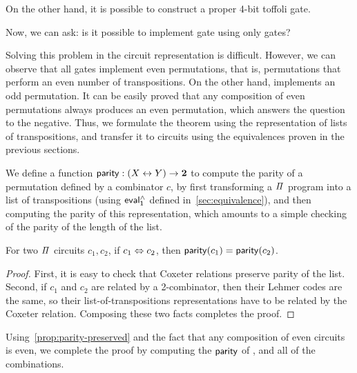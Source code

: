 \noindent
On the other hand, it is possible to construct a proper 4-bit toffoli gate.
\medskip
\toffoli{}

\noindent
Now, we can ask: is it possible to implement  gate using only  gates?
\medskip

Solving this problem in the circuit representation is difficult. However, we can observe that all  gates
implement even permutations, that is, permutations that perform an even number of transpositions. On the other hand,
 implements an odd permutation. It can be easily proved that any composition of even permutations always
produces an even permutation, which answers the question to the negative. Thus, we formulate the theorem using the
representation of lists of transpositions, and transfer it to circuits using the equivalences proven in the previous
sections.

We define a function $\operatorname{\mathsf{parity}} : (X \mathrel{\leftrightarrow} Y) \to {\mathbf{2}}$ to compute the parity of a permutation defined by a combinator
$c$, by first transforming a $\mathit{\Pi}$ program into a list of transpositions (using $\evalh_{1}$ defined
in~\cref{sec:equivalence}), and then computing the parity of this representation, which amounts to a simple checking of
the parity of the length of the list.

\begin{propositionrep}
  \label{prop:parity-preserved}
  For two $\mathit{\Pi}$ circuits $c_1, c_2$, if $c_1 \mathrel{\Leftrightarrow} c_2$, then $\operatorname{\mathsf{parity}}(c_1) = \operatorname{\mathsf{parity}}(c_2)$.
\end{propositionrep}
\begin{proof}
  First, it is easy to check that Coxeter relations preserve parity of the list. Second, if $c_1$ and $c_2$ are related
  by a 2-combinator, then their Lehmer codes are the same, so their list-of-transpositions representations have to be
  related by the Coxeter relation. Composing these two facts completes the proof.
\end{proof}

\noindent
Using~\cref{prop:parity-preserved} and the fact that any composition of even circuits is even, we complete the proof by
computing the $\operatorname{\mathsf{parity}}$ of , and all of the  combinations.


